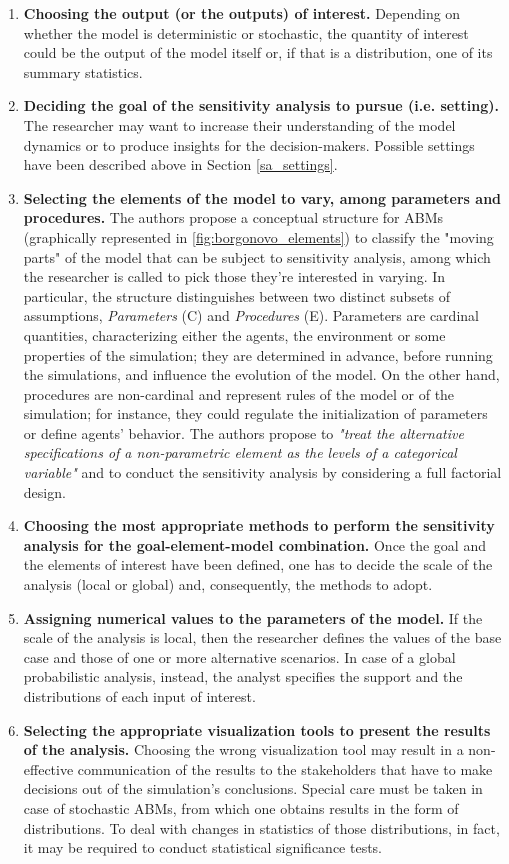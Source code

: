 \begin{enumerate}
    \item \textbf{Choosing the output (or the outputs) of interest.} Depending on whether the model is deterministic or stochastic, the quantity of interest could be the output of the model itself or, if that is a distribution, one of its summary statistics. 
    \item \textbf{Deciding the goal of the sensitivity analysis to pursue (i.e. setting).} The researcher may want to increase their understanding of the model dynamics or to produce insights for the decision-makers. Possible settings have been described above in Section \ref{sa_settings}.
    \item \textbf{Selecting the elements of the model to vary, among parameters and procedures.} The authors propose a conceptual structure for ABMs (graphically represented in \ref{fig:borgonovo_elements}) to classify the "moving parts" of the model that can be subject to sensitivity analysis, among which the researcher is called to pick those they're interested in varying. In particular, the structure distinguishes between two distinct subsets of assumptions, \textit{Parameters} (C) and \textit{Procedures} (E). Parameters are cardinal quantities, characterizing either the agents, the environment or some properties of the simulation; they are determined in advance, before running the simulations, and influence the evolution of the model. On the other hand, procedures are non-cardinal and represent rules of the model or of the simulation; for instance, they could regulate the initialization of parameters or define agents' behavior. The authors propose to \textit{"treat the alternative specifications of a non-parametric element as the levels of a categorical variable"} and to conduct the sensitivity analysis by considering a full factorial design. 
    \item \textbf{Choosing the most appropriate methods to perform the sensitivity analysis for the goal-element-model combination.} Once the goal and the elements of interest have been defined, one has to decide the scale of the analysis (local or global) and, consequently, the methods to adopt. 
    \item \textbf{Assigning numerical values to the parameters of the model.} If the scale of the analysis is local, then the researcher defines the values of the base case and those of one or more alternative scenarios. In case of a global probabilistic analysis, instead, the analyst specifies the support and the distributions of each input of interest.
    \item \textbf{Selecting the appropriate visualization tools to present the results of the analysis.} Choosing the wrong visualization tool may result in a non-effective communication of the results to the stakeholders that have to make decisions out of the simulation's conclusions. Special care must be taken in case of stochastic ABMs, from which one obtains results in the form of distributions. To deal with changes in statistics of those distributions, in fact, it may be required to conduct statistical significance tests.
\end{enumerate}

